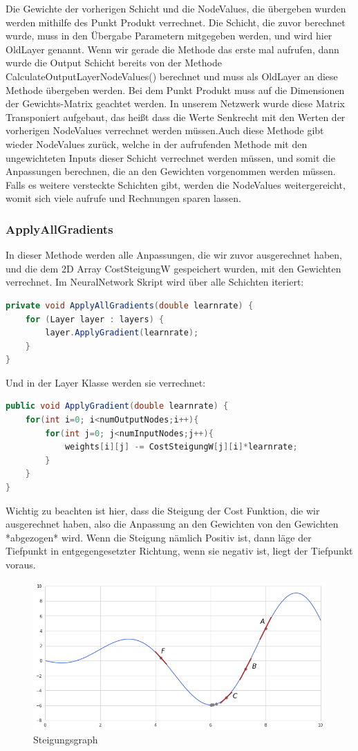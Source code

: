 \documentclass[12pt]{article}
\begin{document}
Die Gewichte der vorherigen Schicht und die NodeValues, die übergeben wurden werden mithilfe des Punkt Produkt verrechnet. Die Schicht, die zuvor berechnet wurde, muss in den Übergabe Parametern mitgegeben werden, und wird hier OldLayer genannt. Wenn wir gerade die Methode das erste mal aufrufen, dann wurde die Output Schicht bereits von der Methode CalculateOutputLayerNodeValues() berechnet und muss als OldLayer an diese Methode übergeben werden.
Bei dem Punkt Produkt muss auf die Dimensionen der Gewichts-Matrix geachtet werden. In unserem Netzwerk wurde diese Matrix Transponiert aufgebaut, das heißt dass die Werte Senkrecht mit den Werten der vorherigen NodeValues verrechnet werden müssen.Auch diese Methode gibt wieder NodeValues zurück, welche in der aufrufenden Methode mit den ungewichteten Inputs dieser Schicht verrechnet werden müssen, und somit die Anpassungen berechnen, die an den Gewichten vorgenommen werden müssen. Falls es weitere versteckte Schichten gibt, werden die NodeValues weitergereicht, womit sich viele aufrufe und Rechnungen sparen lassen.\subsubsection{ApplyAllGradients}In dieser Methode werden alle Anpassungen, die wir zuvor ausgerechnet haben, und die dem 2D Array CostSteigungW gespeichert wurden, mit den Gewichten verrechnet. Im NeuralNetwork Skript wird über alle Schichten iteriert:\begin{lstlisting}[language=Java]
private void ApplyAllGradients(double learnrate) {
    for (Layer layer : layers) {
        layer.ApplyGradient(learnrate);
    }
}
\end{lstlisting}Und in der Layer Klasse werden sie verrechnet:\begin{lstlisting}[language=Java]
public void ApplyGradient(double learnrate) {
    for(int i=0; i<numOutputNodes;i++){
        for(int j=0; j<numInputNodes;j++){
            weights[i][j] -= CostSteigungW[j][i]*learnrate;
        }
    }
}
\end{lstlisting}Wichtig zu beachten ist hier, dass die Steigung der Cost Funktion, die wir ausgerechnet haben, also die Anpassung an den Gewichten von den Gewichten *abgezogen* wird. Wenn die Steigung nämlich Positiv ist, dann läge der Tiefpunkt in entgegengesetzter Richtung, wenn sie negativ ist, liegt der Tiefpunkt voraus.\begin{figure}[H]
\centering
\includegraphics[scale=0.55]{./Images/Pasted image 20230917195146.png}
\caption{Steigungsgraph}
\label{Was kommt hier rein?}
\end{figure}
\end{document}
